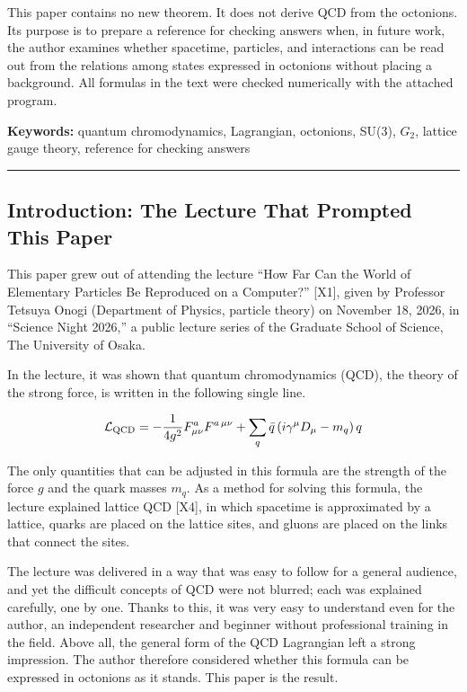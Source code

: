 \documentclass[
  a4paper,
]{article}
\begin{document}
This paper contains no new theorem. It does not derive QCD from the
octonions. Its purpose is to prepare a reference for checking answers
when, in future work, the author examines whether spacetime, particles,
and interactions can be read out from the relations among states
expressed in octonions without placing a background. All formulas in the
text were checked numerically with the attached program.

\textbf{Keywords:} quantum chromodynamics, Lagrangian, octonions, SU(3),
\(G_2\), lattice gauge theory, reference for checking answers

\begin{center}\rule{0.5\linewidth}{0.5pt}\end{center}

\subsection{Introduction: The Lecture That Prompted This
Paper}\label{introduction-the-lecture-that-prompted-this-paper}

This paper grew out of attending the lecture ``How Far Can the World of
Elementary Particles Be Reproduced on a Computer?'' {[}X1{]}, given by
Professor Tetsuya Onogi (Department of Physics, particle theory) on
November 18, 2026, in ``Science Night 2026,'' a public lecture series of
the Graduate School of Science, The University of Osaka.

In the lecture, it was shown that quantum chromodynamics (QCD), the
theory of the strong force, is written in the following single line.

\[
\mathcal{L}_{\rm QCD} = -\frac{1}{4g^2}F^a_{\mu\nu}F^{a\,\mu\nu} + \sum_q \bar q\,(i\gamma^\mu D_\mu - m_q)\,q
\]

The only quantities that can be adjusted in this formula are the
strength of the force \(g\) and the quark masses \(m_q\). As a method
for solving this formula, the lecture explained lattice QCD {[}X4{]}, in
which spacetime is approximated by a lattice, quarks are placed on the
lattice sites, and gluons are placed on the links that connect the
sites.

The lecture was delivered in a way that was easy to follow for a general
audience, and yet the difficult concepts of QCD were not blurred; each
was explained carefully, one by one. Thanks to this, it was very easy to
understand even for the author, an independent researcher and beginner
without professional training in the field. Above all, the general form
of the QCD Lagrangian left a strong impression. The author therefore
considered whether this formula can be expressed in octonions as it
stands. This paper is the result.
\end{document}
